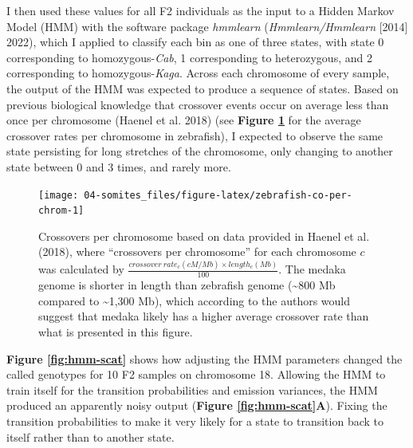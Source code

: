 \documentclass[
]{book}
\begin{document}
I then used these values for all F2 individuals as the input to a Hidden Markov Model (HMM) with the software package \emph{hmmlearn} (\emph{Hmmlearn/Hmmlearn} {[}2014{]} 2022), which I applied to classify each bin as one of three states, with state 0 corresponding to homozygous-\emph{Cab}, 1 corresponding to heterozygous, and 2 corresponding to homozygous-\emph{Kaga}. Across each chromosome of every sample, the output of the HMM was expected to produce a sequence of states. Based on previous biological knowledge that crossover events occur on average less than once per chromosome (Haenel et al. 2018) (see \textbf{Figure \ref{fig:zebrafish-co-per-chrom}} for the average crossover rates per chromosome in zebrafish), I expected to observe the same state persisting for long stretches of the chromosome, only changing to another state between 0 and 3 times, and rarely more.



\begin{figure}
\texttt{[image: 04-somites\_files/figure-latex/zebrafish-co-per-chrom-1]} \caption{Crossovers per chromosome based on data provided in Haenel et al. (2018), where ``crossovers per chromosome'' for each chromosome \(c\) was calculated by \(\frac{crossover~rate_{c}(cM / Mb) \times length_{c}(Mb)} {100}\). The medaka genome is shorter in length than zebrafish genome (\textasciitilde800 Mb compared to \textasciitilde1,300 Mb), which according to the authors would suggest that medaka likely has a higher average crossover rate than what is presented in this figure.}\label{fig:zebrafish-co-per-chrom}
\end{figure}

\textbf{Figure \ref{fig:hmm-scat}} shows how adjusting the HMM parameters changed the called genotypes for 10 F2 samples on chromosome 18. Allowing the HMM to train itself for the transition probabilities and emission variances, the HMM produced an apparently noisy output (\textbf{Figure \ref{fig:hmm-scat}A}). Fixing the transition probabilities to make it very likely for a state to transition back to itself rather than to another state.
\end{document}
